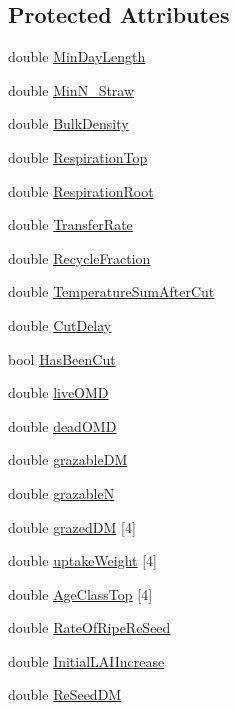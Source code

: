\subsection*{Protected Attributes}
\begin{DoxyCompactItemize}
\item 
double \hyperlink{classcrop_ryegrass_ad0c31787525448d29e932a5d05476978}{MinDayLength}
\item 
double \hyperlink{classcrop_ryegrass_a9eae1ff94eb994ed040a740ce40b6e06}{MinN\_\-Straw}
\item 
double \hyperlink{classcrop_ryegrass_a851332fb794a51440e3930cb53f03802}{BulkDensity}
\item 
double \hyperlink{classcrop_ryegrass_a28d4c2eb58e04a840f3be6277a13e51b}{RespirationTop}
\item 
double \hyperlink{classcrop_ryegrass_aebf442425c9fe0662ad5f60a61792500}{RespirationRoot}
\item 
double \hyperlink{classcrop_ryegrass_ae11486448ac560cb05033e804aea5316}{TransferRate}
\item 
double \hyperlink{classcrop_ryegrass_a425c715cfd92033db6af5b091903af98}{RecycleFraction}
\item 
double \hyperlink{classcrop_ryegrass_a3f0d73c30fb6fe15198a3beca5a68a6e}{TemperatureSumAfterCut}
\item 
double \hyperlink{classcrop_ryegrass_a75af628b7d7bb576d4c9285391d292b2}{CutDelay}
\item 
bool \hyperlink{classcrop_ryegrass_affc800f21a3c26e2277a8e5679c27204}{HasBeenCut}
\item 
double \hyperlink{classcrop_ryegrass_a0b667252165fc134819df04548618d56}{liveOMD}
\item 
double \hyperlink{classcrop_ryegrass_aad215af4abecd60bf33e223aafec8e6c}{deadOMD}
\item 
double \hyperlink{classcrop_ryegrass_aebfc7e7f1e48269a0b41f08c27072b61}{grazableDM}
\item 
double \hyperlink{classcrop_ryegrass_a6fd909e402b37a89599cef6d026671c0}{grazableN}
\item 
double \hyperlink{classcrop_ryegrass_a60b9ccc77a862693545200a71d113608}{grazedDM} \mbox{[}4\mbox{]}
\item 
double \hyperlink{classcrop_ryegrass_a445c84d8258d5047e62dcd3d222cf8bd}{uptakeWeight} \mbox{[}4\mbox{]}
\item 
double \hyperlink{classcrop_ryegrass_ae9641d6c7c5459eb6053cb421df4e8d0}{AgeClassTop} \mbox{[}4\mbox{]}
\item 
double \hyperlink{classcrop_ryegrass_ad38b65aa16d9136baee37d9f6faff1a0}{RateOfRipeReSeed}
\item 
double \hyperlink{classcrop_ryegrass_ababb5c5bbefcf437f81ac636fbbf3805}{InitialLAIIncrease}
\item 
double \hyperlink{classcrop_ryegrass_a20afe6ee954c51fafe8d0c184c395c65}{ReSeedDM}
\end{DoxyCompactItemize}



